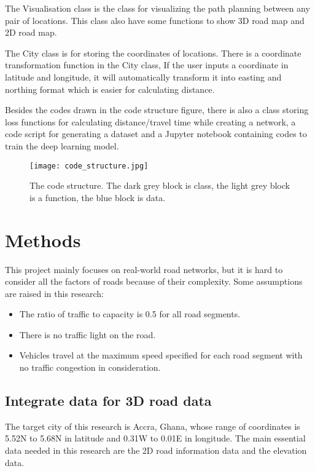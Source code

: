 \documentclass[final-report]{report-template}
\begin{document}
The Visualisation class is the class for visualizing the path planning between any pair of locations.
This class also have some functions to show 3D road map and 2D road map.

The City class is for storing the coordinates of locations. There is a coordinate transformation function in the City class, 
If the user inputs a coordinate in latitude and longitude, it will automatically transform it into easting and northing format 
which is easier for calculating distance.

Besides the codes drawn in the code structure figure, 
there is also a class storing loss functions for calculating distance/travel time while creating a network,
a code script for generating a dataset and a Jupyter notebook containing codes to train the deep learning model.
\begin{figure}[H]
    \begin{center}
        \texttt{[image: code\_structure.jpg]}
    \end{center}
    \caption{\label{fig:code_struc} The code structure. The dark grey block is class, the light grey block is a function, the blue block is data.}
\end{figure}
\section {Methods}
This project mainly focuses on real-world road networks, 
but it is hard to consider all the factors of roads because of their complexity.
Some assumptions are raised in this research:
\begin{itemize}
    \item The ratio of traffic to capacity is 0.5 for all road segments.
    \item There is no traffic light on the road.
    \item Vehicles travel at the maximum speed specified for each road segment with no traffic congestion in consideration.
\end{itemize}
\subsection {Integrate data for 3D road data}
The target city of this research is Accra, Ghana, whose range of coordinates is 5.52N to 5.68N in latitude and 0.31W to 0.01E in longitude.
The main essential data needed in this research are the 2D road information data and the elevation data. 
\end{document}
